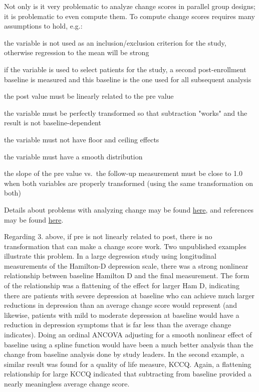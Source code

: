 Not only is it very problematic to analyze change scores in parallel
group designs; it is problematic to even compute them.  To compute
change scores requires many assumptions to hold, e.g.:  
\be
\item the variable is not used as an inclusion/exclusion criterion for the study, otherwise regression to the mean will be strong
\item if the variable is used to select patients for the study, a second post-enrollment baseline is measured and this baseline is the one used for all subsequent analysis
\item the post value must be linearly related to the pre value
\item the variable must be perfectly transformed so that subtraction "works" and the result is not baseline-dependent
\item the variable must not have floor and ceiling effects
\item the variable must have a smooth distribution
\item the slope of the pre value vs.\ the follow-up measurement must be close to 1.0 when both variables are properly transformed (using the same transformation on both)
\ee

Details about problems with analyzing change may be found \href{https://hbiostat.org/bbr/md/change.html}{here}, and references may be found \href{https://hbiostat.org/bib/change.html}{here}.

Regarding 3. above, if pre is not linearly related to post, there is 
no transformation that can make a change score work.  Two unpublished
examples illustrate this problem.  In a large degression study using
longitudinal measurements of the Hamilton-D depression scale, there
was a strong nonlinear relationship between baseline Hamilton D and
the final measurement.  The form of the relationship was a flattening
of the effect for larger Ham D, indicating there are patients with
severe depression at baseline who can achieve much larger reductions
in depression than an average change score would represent (and
likewise, patients with mild to moderate depression at baseline would
have a reduction in depression symptoms that is far less than the
average change indicates).  Doing an ordinal ANCOVA adjusting for a
smooth nonlinear effect of baseline using a spline function would have
been a much better analysis than the change from baseline analysis
done by study leaders.  In the second example, a similar result was
found for a quality of life measure, KCCQ.  Again, a flattening
relationship for large KCCQ indicated that subtracting from baseline
provided a nearly meaningless average change score. 

